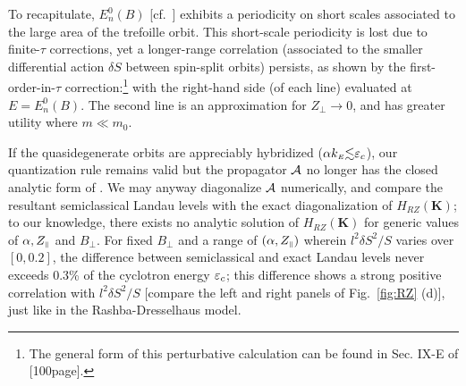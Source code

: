 \documentclass[aps, prb, showpacs, twocolumn, notitlepage, superscriptaddress]{revtex4-1}
\begin{document}
To recapitulate, $E_n^0(B)$ [cf.\ ] exhibits a periodicity on short scales associated to the large area of the trefoille orbit. This short-scale periodicity is lost due to  finite-$\tau$ corrections, yet a longer-range correlation (associated to the smaller differential action $\delta S$ between spin-split orbits) persists, as shown by the first-order-in-$\tau$ correction:\footnote{The general form of this perturbative calculation can be found in Sec. IX-E of [100page].} 
with the right-hand side (of each line) evaluated at $E{=}E_n^0(B)$. The second line is an approximation for $Z_{\perp}{\rightarrow}0$, and has greater utility where $m{\ll}m_0$. 



If the quasidegenerate orbits are appreciably hybridized ($\alpha k_{\scriptscriptstyle{E}}{\lesssim}\varepsilon_c$), our quantization rule  remains valid but the propagator ${\cal A}$ no longer has the closed analytic form of . We may anyway diagonalize ${\cal A}$ numerically, and compare the resultant semiclassical Landau levels with the exact diagonalization of $H_{RZ}(\boldsymbol{K})$; to our knowledge, there exists no analytic solution of $H_{RZ}(\boldsymbol{K})$ for generic values of $\alpha,Z_{\scriptscriptstyle{\parallel}}$ and $B_{\perp}$. For fixed  $B_{\perp}$ and a range of $(\alpha,Z_{\scriptscriptstyle{\parallel}})$ wherein  $l^2\delta S^2/S$ varies over $[0,0.2]$, the difference between semiclassical and exact Landau levels never exceeds  0.3\% of the cyclotron energy $\varepsilon_c$; this difference shows a strong positive correlation with $l^2\delta S^2/S$ [compare the left and right panels of Fig.\ \ref{fig:RZ} (d)], just like in the Rashba-Dresselhaus model. 


\end{document}
